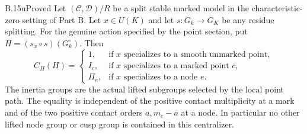 \begin{claim}{B.15u}{Proved}
Let $(\mathcal C,\mathcal D)/R$ be a split stable marked model in the
characteristic-zero setting of Part B. Let $x\in U(K)$ and let
$s:G_k\to G_K$ be any residue splitting. For the genuine action specified
by the point section, put
$H=(s_x\circ s)(G_k^\circ)$. Then
\[
 C_\Pi(H)=
 \begin{cases}
  1,&\text{if $x$ specializes to a smooth unmarked point},\\
  I_c,&\text{if $x$ specializes to a marked point $c$},\\
  \Pi_e,&\text{if $x$ specializes to a node $e$}.
 \end{cases}
\]
The inertia groups are the actual lifted subgroups selected by the local
point path. The equality is independent of the positive contact
multiplicity at a mark and of the two positive contact orders
$a,m_e-a$ at a node. In particular no other lifted node group or cusp
group is contained in this centralizer.
\end{claim}
